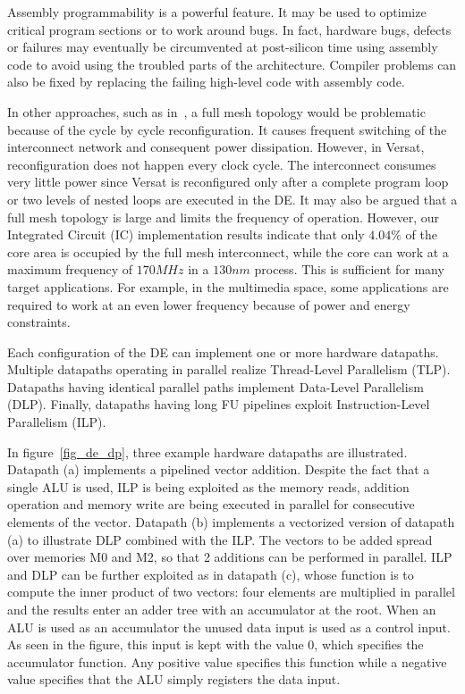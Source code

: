 \documentclass[journal]{IEEEtran}
\begin{document}
Assembly programmability is a powerful feature. It may be used to
optimize critical program sections or to work around bugs. In fact,
hardware bugs, defects or failures may eventually be circumvented at
post-silicon time using assembly code to avoid using the troubled
parts of the architecture. Compiler problems can also be fixed by
replacing the failing high-level code with assembly code.

In other approaches, such as in~\cite{Mei05}, a full mesh topology
would be problematic because of the cycle by cycle reconfiguration. It
causes frequent switching of the interconnect network and consequent
power dissipation. However, in Versat, reconfiguration does not happen
every clock cycle. The interconnect consumes very little power since
Versat is reconfigured only after a complete program loop or two
levels of nested loops are executed in the DE. It may also be argued
that a full mesh topology is large and limits the frequency of
operation. However, our Integrated Circuit (IC) implementation results
indicate that only $4.04\%$ of the core area is occupied by the full
mesh interconnect, while the core can work at a maximum frequency of
$170MHz$ in a $130nm$ process. This is sufficient for many target
applications. For example, in the multimedia space, some applications
are required to work at an even lower frequency because of power and
energy constraints.

Each configuration of the DE can implement one or more hardware
datapaths. Multiple datapaths operating in parallel realize
Thread-Level Parallelism (TLP). Datapaths having identical parallel
paths implement Data-Level Parallelism (DLP). Finally, datapaths
having long FU pipelines exploit Instruction-Level Parallelism (ILP).

In figure~\ref{fig_de_dp}, three example hardware datapaths are
illustrated. Datapath (a) implements a pipelined vector
addition. Despite the fact that a single ALU is used, ILP is being
exploited as the memory reads, addition operation and memory write are
being executed in parallel for consecutive elements of the
vector. Datapath (b) implements a vectorized version of datapath (a)
to illustrate DLP combined with the ILP. The vectors to be added
spread over memories M0 and M2, so that 2 additions can be performed
in parallel. ILP and DLP can be further exploited as in datapath (c),
whose function is to compute the inner product of two vectors: four
elements are multiplied in parallel and the results enter an adder
tree with an accumulator at the root. When an ALU is used as an
accumulator the unused data input is used as a control input. As seen
in the figure, this input is kept with the value 0, which specifies
the accumulator function. Any positive value specifies this function
while a negative value specifies that the ALU simply registers the
data input.
\end{document}
